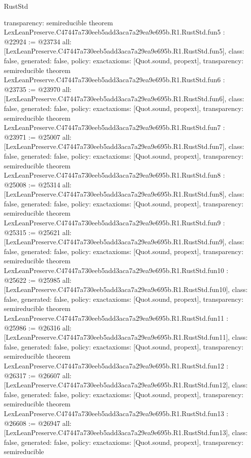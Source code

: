 \begin{lexlean}{RustStd}
\begin{coremodule}
{  transparency: semireducible
}
theorem LexLeanPreserve.C47447a730eeb5add3aca7a29ea9e695b.R1.RustStd.fun5 : @22924 := @23734 {
  all: [LexLeanPreserve.C47447a730eeb5add3aca7a29ea9e695b.R1.RustStd.fun5],
  class: false,
  generated: false,
  policy: exact{axioms: [Quot.sound, propext]},
  transparency: semireducible
}
theorem LexLeanPreserve.C47447a730eeb5add3aca7a29ea9e695b.R1.RustStd.fun6 : @23735 := @23970 {
  all: [LexLeanPreserve.C47447a730eeb5add3aca7a29ea9e695b.R1.RustStd.fun6],
  class: false,
  generated: false,
  policy: exact{axioms: [Quot.sound, propext]},
  transparency: semireducible
}
theorem LexLeanPreserve.C47447a730eeb5add3aca7a29ea9e695b.R1.RustStd.fun7 : @23971 := @25007 {
  all: [LexLeanPreserve.C47447a730eeb5add3aca7a29ea9e695b.R1.RustStd.fun7],
  class: false,
  generated: false,
  policy: exact{axioms: [Quot.sound, propext]},
  transparency: semireducible
}
theorem LexLeanPreserve.C47447a730eeb5add3aca7a29ea9e695b.R1.RustStd.fun8 : @25008 := @25314 {
  all: [LexLeanPreserve.C47447a730eeb5add3aca7a29ea9e695b.R1.RustStd.fun8],
  class: false,
  generated: false,
  policy: exact{axioms: [Quot.sound, propext]},
  transparency: semireducible
}
theorem LexLeanPreserve.C47447a730eeb5add3aca7a29ea9e695b.R1.RustStd.fun9 : @25315 := @25621 {
  all: [LexLeanPreserve.C47447a730eeb5add3aca7a29ea9e695b.R1.RustStd.fun9],
  class: false,
  generated: false,
  policy: exact{axioms: [Quot.sound, propext]},
  transparency: semireducible
}
theorem LexLeanPreserve.C47447a730eeb5add3aca7a29ea9e695b.R1.RustStd.fun10 : @25622 := @25985 {
  all: [LexLeanPreserve.C47447a730eeb5add3aca7a29ea9e695b.R1.RustStd.fun10],
  class: false,
  generated: false,
  policy: exact{axioms: [Quot.sound, propext]},
  transparency: semireducible
}
theorem LexLeanPreserve.C47447a730eeb5add3aca7a29ea9e695b.R1.RustStd.fun11 : @25986 := @26316 {
  all: [LexLeanPreserve.C47447a730eeb5add3aca7a29ea9e695b.R1.RustStd.fun11],
  class: false,
  generated: false,
  policy: exact{axioms: [Quot.sound, propext]},
  transparency: semireducible
}
theorem LexLeanPreserve.C47447a730eeb5add3aca7a29ea9e695b.R1.RustStd.fun12 : @26317 := @26607 {
  all: [LexLeanPreserve.C47447a730eeb5add3aca7a29ea9e695b.R1.RustStd.fun12],
  class: false,
  generated: false,
  policy: exact{axioms: [Quot.sound, propext]},
  transparency: semireducible
}
theorem LexLeanPreserve.C47447a730eeb5add3aca7a29ea9e695b.R1.RustStd.fun13 : @26608 := @26947 {
  all: [LexLeanPreserve.C47447a730eeb5add3aca7a29ea9e695b.R1.RustStd.fun13],
  class: false,
  generated: false,
  policy: exact{axioms: [Quot.sound, propext]},
  transparency: semireducible
}
\end{coremodule}
\end{lexlean}
